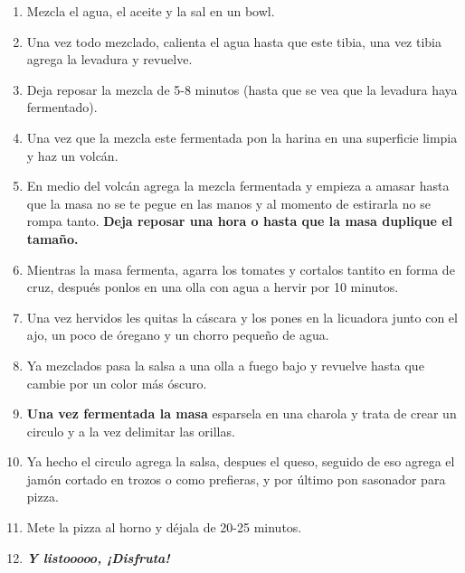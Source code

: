 \documentclass[10pt]{article}
\begin{document}
\begin{enumerate}
    \item Mezcla el agua, el aceite y la sal en un bowl.
    \item Una vez todo mezclado, calienta el agua hasta que este tibia, una vez tibia agrega la levadura y revuelve.
    \item Deja reposar la mezcla de 5-8 minutos (hasta que se vea que la levadura haya fermentado).
    \item Una vez que la mezcla este fermentada pon la harina en una superficie limpia y haz un volcán.
    \item En medio del volcán agrega la mezcla fermentada y empieza a amasar hasta que la masa no se te pegue en las manos y al momento de estirarla no se rompa tanto. \textbf{Deja reposar una hora o hasta que la masa duplique el tamaño.}
    \item Mientras la masa fermenta, agarra los tomates y cortalos tantito en forma de cruz, después ponlos en una olla con agua a hervir por 10 minutos.
    \item Una vez hervidos les quitas la cáscara y los pones en la licuadora junto con el ajo, un poco de óregano y un chorro pequeño de agua.
    \item Ya mezclados pasa la salsa a una olla a fuego bajo y revuelve hasta que cambie por un color más óscuro.
    \item \textbf{Una vez fermentada la masa} esparsela en una charola y trata de crear un circulo y a la vez delimitar las orillas.
    \item Ya hecho el circulo agrega la salsa, despues el queso, seguido de eso agrega el jamón cortado en trozos o como prefieras, y por último pon sasonador para pizza.
    \item Mete la pizza al horno y déjala de 20-25 minutos.
    \item \textbf{\textit{Y listooooo, ¡Disfruta!}}
    
\end{enumerate}
\end{document}
